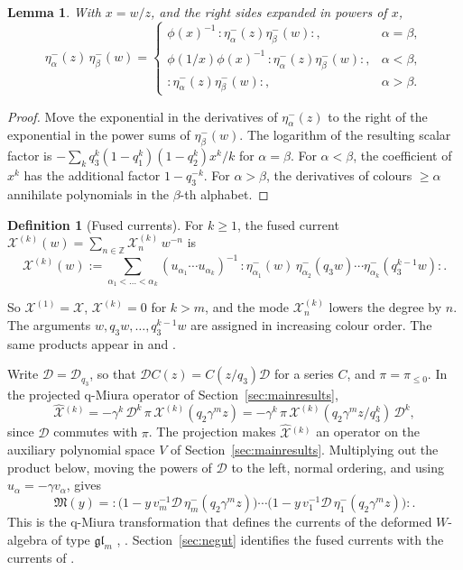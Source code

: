 \documentclass[11pt]{amsart}
\newtheorem{lemma}[theorem]{Lemma}
\theoremstyle{definition}
\newtheorem{definition}[theorem]{Definition}
\theoremstyle{remark}
\newcommand{\DD}{\mathcal D}
\newcommand{\Twist}[1]{\DD_{#1}}                 %
\newcommand{\pile}{\pi_{\leq0}}                  %
\newcommand{\Xcur}{\mathcal X}                   %
\newcommand{\Xk}[1]{\mathcal X^{(#1)}}           %
\newcommand{\Xhat}[1]{\widehat{\mathcal X}{}^{(#1)}}   %
\newcommand{\Miuraop}{\mathfrak M}               %
\begin{document}
\begin{lemma}\label{lem:normalorder}
With \(x=w/z\), and the right sides expanded in powers of \(x\),
\[
 \eta^-_\alpha(z)\,\eta^-_\beta(w)=
 \begin{cases}
 \phi(x)^{-1}\,{:}\eta^-_\alpha(z)\eta^-_\beta(w){:},&\alpha=\beta,\\
 \phi(1/x)\phi(x)^{-1}\,{:}\eta^-_\alpha(z)\eta^-_\beta(w){:},&\alpha<\beta,\\
 {:}\eta^-_\alpha(z)\eta^-_\beta(w){:},&\alpha>\beta.
 \end{cases}
\]
\end{lemma}

\begin{proof}
Move the exponential in the derivatives of \(\eta^-_\alpha(z)\) to the right of the exponential
in the power sums of \(\eta^-_\beta(w)\). The logarithm of the resulting scalar factor is
\(-\sum_kq_3^k(1-q_1^k)(1-q_2^k)x^k/k\) for \(\alpha=\beta\).
For \(\alpha<\beta\), the coefficient of \(x^k\) has the additional factor \(1-q_3^{-k}\).
For \(\alpha>\beta\), the derivatives of colours \(\geq\alpha\) annihilate
polynomials in the \(\beta\)-th alphabet.
\end{proof}

\begin{definition}[Fused currents]\label{def:fused}
For \(k\geq1\), the fused current \(\Xk{k}(w)=\sum_{n\in\mathbb Z}\Xk{k}_n\,w^{-n}\) is
\[
 \Xk{k}(w):=\sum_{\alpha_1<\dots<\alpha_k}(u_{\alpha_1}\cdots u_{\alpha_k})^{-1}\,
 {:}\eta^-_{\alpha_1}(w)\,\eta^-_{\alpha_2}(q_3w)\cdots\eta^-_{\alpha_k}(q_3^{k-1}w){:}.
\]
\end{definition}

So \(\Xk{1}=\Xcur\), \(\Xk{k}=0\) for \(k>m\), and the mode \(\Xk{k}_n\) lowers the degree by \(n\). The
arguments \(w,q_3w,\dots,q_3^{k-1}w\) are assigned in increasing colour order. The same products appear in
\cite[Section~3.1]{AFHKSY} and \cite{FHSSY}.

Write \(\DD=\Twist{q_3}\), so that \(\DD C(z)=C(z/q_3)\DD\) for a series \(C\), and \(\pi=\pile\). In the
projected q-Miura operator of Section~\ref{sec:mainresults},
\[
 \Xhat{k}=-\gamma^k\,\DD^k\,\pi\,\Xk{k}(q_2\gamma^mz)=-\gamma^k\,\pi\,\Xk{k}(q_2\gamma^mz/q_3^k)\,\DD^k,
\]
since \(\DD\) commutes with \(\pi\). The projection makes \(\Xhat{k}\) an operator on
the auxiliary polynomial space \(V\) of Section~\ref{sec:mainresults}. Multiplying out
the product below, moving the powers of \(\DD\) to the left, normal ordering, and using
\(u_\alpha=-\gamma v_\alpha\), gives
\[
 \Miuraop(y)={:}\bigl(1-y\,v_m^{-1}\DD\,\eta^-_m(q_2\gamma^mz)\bigr)\cdots
 \bigl(1-y\,v_1^{-1}\DD\,\eta^-_1(q_2\gamma^mz)\bigr){:}.
\]
This is the q-Miura transformation that defines the currents of the deformed \(W\)-algebra of
type \(\mathfrak{gl}_m\) \cite{FR,FF,AKOS}, \cite[(5.3)]{N3}. Section~\ref{sec:negut} identifies the
fused currents with the currents of \cite{N3}.
\end{document}

